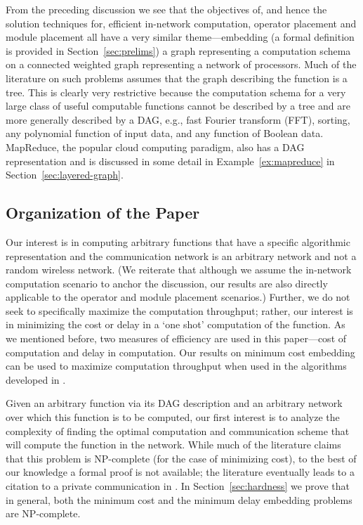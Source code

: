 \documentclass[journal]{IEEEtran}
\begin{document}
From the preceding discussion we see that the objectives of, and hence
the solution techniques for, efficient in-network computation,
operator placement and module placement all have a very similar
theme---embedding (a formal definition is provided in
Section~\ref{sec:prelims}) a graph representing a computation schema
on a connected weighted graph representing a network of
processors. Much of the literature on such problems assumes that the
graph describing the function is a tree. This is clearly very
restrictive because the computation schema for a very large class of
useful computable functions cannot be described by a tree and are more
generally described by a DAG, e.g., fast Fourier transform (FFT),
sorting, any polynomial function of input data, and any function of
Boolean data.  MapReduce, the popular cloud computing paradigm, also
has a DAG representation and is discussed in some detail in
Example~\ref{ex:mapreduce} in Section~\ref{sec:layered-graph}.

\subsection{Organization of the Paper}

Our interest is in computing arbitrary functions that have a specific
algorithmic representation and the communication network is an
arbitrary network and not a random wireless network. (We reiterate
that although we assume the in-network computation scenario to anchor
the discussion, our results are also directly applicable to the
operator and module placement scenarios.)  Further, we do not seek to
specifically maximize the computation throughput; rather, our interest
is in minimizing the cost or delay in a `one shot' computation of the
function. As we mentioned before, two measures of efficiency are used
in this paper---cost of computation and delay in computation. Our
results on minimum cost embedding can be used to maximize computation
throughput when used in the algorithms developed in \cite{Shah13}.

Given an arbitrary function via its DAG description and an arbitrary
network over which this function is to be computed, our first interest
is to analyze the complexity of finding the optimal computation and
communication scheme that will compute the function in the
network. While much of the literature claims that this problem is
NP-complete (for the case of minimizing cost), to the best of our
knowledge a formal proof is not available; the literature eventually
leads to a citation to a private communication in \cite{Bokhari81}. In
Section~\ref{sec:hardness} we prove that in general, both the minimum
cost and the minimum delay embedding problems are NP-complete.
\end{document}
